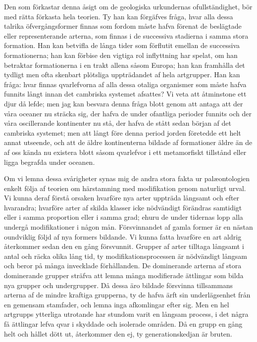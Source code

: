 Den som förkastar denna åsigt om de geologiska urkundernas ofullständighet, bör med rätta förkasta hela teorien. Ty han kan förgäfves fråga, hvar alla dessa talrika öfvergångsformer finnas som fordom måste hafva förenat de beslägtade eller representerande arterna, som finnas i de successiva stadierna i samma stora formation. Han kan betvifla de långa tider som förflutit emellan de successiva formationerna; han kan förbise den vigtiga rol inflyttning har spelat, om han betraktar formationerna i en trakt allena såsom Europa; han kan framhålla det tydligt men ofta skenbart plötsliga uppträdandet af hela artgrupper. Han kan fråga: hvar finnas qvarlefvorna af alla dessa otaliga organismer som måste hafva funnits långt innan det cambriska systemet afsattes? Vi veta att åtminstone ett djur då lefde; men jag kan besvara denna fråga blott genom att antaga att der våra oceaner nu sträcka sig, der hafva de under ofantliga perioder funnits och der våra oscillerande kontinenter nu stå, der hafva de stått sedan början af det cambriska systemet; men att långt före denna period jorden företedde ett helt annat utseende, och att de äldre kontinenterna bildade af formationer äldre än de af oss kända nu existera blott såsom qvarlefvor i ett metamorfiskt tillstånd eller ligga begrafda under oceanen.

Om vi lemna dessa svårigheter synas mig de andra stora fakta ur palæontologien enkelt följa af teorien om härstamning med modifikation genom naturligt urval. Vi kunna deraf förstå orsaken hvarföre nya arter uppträda långsamt och efter hvarandra; hvarföre arter af skilda klasser icke nödvändigt förändras samtidigt eller i samma proportion eller i samma grad; ehuru de under tidernas lopp alla undergå modifikationer i någon mån. Försvinnandet af gamla former är en nästan oundviklig följd af nya formers bildande. Vi kunna fatta hvarföre en art aldrig återkommer sedan den en gång försvunnit. Grupper af arter tilltaga långsamt i antal och räcka olika lång tid, ty modifikationsprocessen är nödvändigt långsam och beror på många invecklade förhållanden. De dominerande arterna af stora dominerande grupper sträfva att lemna många modifierade ättlingar som bilda nya grupper och undergrupper. Då dessa äro bildade försvinna tillsammans arterna af de mindre kraftiga grupperna, ty de hafva ärft sin underlägsenhet från en gemensam stamfader, och lemna inga afkomlingar efter sig. Men en hel artgrupps ytterliga utrotande har stundom varit en långsam process, i det några få ättlingar lefva qvar i skyddade och isolerade områden. Då en grupp en gång helt och hållet dött ut, återkommer den ej, ty generationskedjan är bruten.

